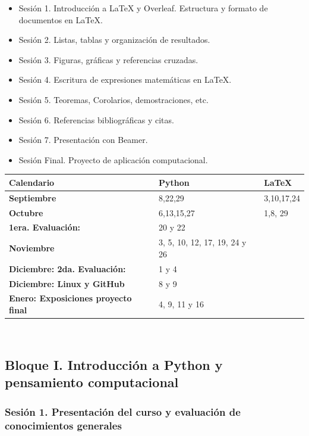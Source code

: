 \documentclass[12pt,letterpaper]{article}
\begin{document}
\begin{itemize}
 \item Sesión 1. Introducción a LaTeX y Overleaf. Estructura y formato de documentos en LaTeX.
 \item Sesión 2. Listas, tablas y organización de resultados.
 \item Sesión 3. Figuras, gráficas y referencias cruzadas.
 \item Sesión 4. Escritura de expresiones matemáticas en LaTeX.
  \item Sesión 5. Teoremas, Corolarios, demostraciones, etc.
 \item Sesión 6. Referencias bibliográficas y citas.
 \item Sesión 7. Presentación con Beamer.

 
 \item Sesión Final. Proyecto de aplicación computacional.

\end{itemize}

\begin{tabular}{lll} \toprule
\textbf{Calendario}&\textbf{Python} & \textbf{\LaTeX} \\ \midrule
\textbf{Septiembre} &8,22,29 & 3,10,17,24\\ \hline
\textbf{Octubre} & 6,13,15,27 & 1,8, 29\\\hline
\textbf{1era. Evaluación:}& 20 y 22 &\\ \hline 
\textbf{Noviembre} & 3, 5, 10, 12, 17, 19, 24 y 26&\\ \hline
\textbf{Diciembre: 2da. Evaluación:} & 1 y 4 & \\\hline
\textbf{Diciembre: Linux y GitHub}& 8 y 9 &\\ \hline 
\textbf{Enero: Exposiciones proyecto final}& 4, 9, 11 y 16&\\ \hline 
\end{tabular}
\\

\subsection{Bloque I. Introducción a Python y pensamiento computacional}

\subsubsection*{Sesión 1. Presentación del curso y evaluación de conocimientos generales}
\end{document}
